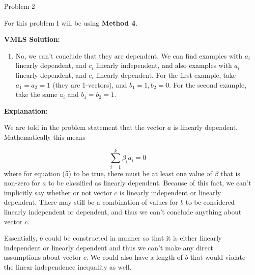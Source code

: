 \begin{problem}{Problem 2}
    \begin{highlight}
        For this problem I will be using \textbf{Method 4}. \vspace*{1em}

        \textbf{VMLS Solution:}

        \begin{enumerate}[label = (\alph*), start = 2]
            \item No, we can’t conclude that they are dependent. We can find examples with $a_{i}$ linearly dependent, and $c_{i}$ linearly independent, and also examples with $a_{i}$ linearly 
            dependent, and $c_{i}$ linearly dependent. For the first example, take $a_{1} = a_{2} = 1$ (they are 1-vectors), and $b_{1} = 1 , b_{2} = 0$. For the second example, take the same $a_{i}$ 
            and $b_{1} = b_{2} = 1$.
        \end{enumerate}

        \textbf{Explanation:} \vspace*{1em}

        We are told in the problem statement that the vector $a$ is linearly dependent. Mathematically this means

        \begin{equation}
            \sum_{i = 1}^{k} \beta_{i}a_{i} = 0
        \end{equation}
        where for equation (5) to be true, there must be at least one value of $\beta$ that is non-zero for $a$ to be classified as linearly dependent. Because of this fact, we can't implicitly say
        whether or not vector $c$ is linearly independent or linearly dependent. There may still be a combination of values for $b$ to be considered linearly independent or dependent, and thus we can't
        conclude anything about vector $c$.

        Essentially, $b$ could be constructed in manner so that it is either linearly independent or linearly dependent and thus we can't make any direct assumptions about vector $c$. We could also have
        a length of $b$ that would violate the linear independence inequality as well.
    \end{highlight}
\end{problem}


